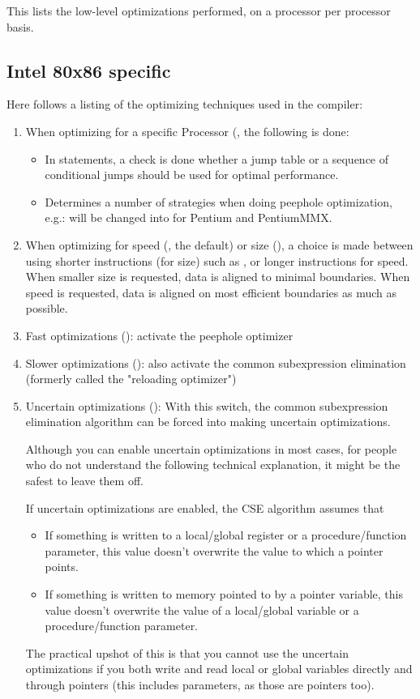 This lists the low-level optimizations performed, on a processor
per processor basis.

\subsection{Intel 80x86 specific}

Here follows a listing of the optimizing techniques used in the compiler:
\begin{enumerate}
\item When optimizing for a specific Processor (,
the following is done:
\begin{itemize}
\item In  statements, a check is done whether a jump table
or a sequence of conditional jumps should be used for optimal performance.
\item Determines a number of strategies when doing peephole optimization, e.g.:
 will be changed into
 for Pentium and PentiumMMX.
\end{itemize}
\item When optimizing for speed (, the default) or size (), a choice is
made between using shorter instructions (for size) such as ,
or longer instructions  for speed. When smaller size is
requested, data is aligned to minimal boundaries.  When speed is
requested, data is aligned on most efficient boundaries as much as possible.
\item Fast optimizations (): activate the peephole optimizer
\item Slower optimizations (): also activate the common subexpression
elimination (formerly called the "reloading optimizer")
\item Uncertain optimizations (): With this switch, the common subexpression
elimination algorithm can be forced into making uncertain optimizations.

Although you can enable uncertain optimizations in most cases, for people who
do not understand the following technical explanation, it might be the safest to
leave them off.

\begin{remark}If uncertain optimizations are enabled, the CSE algorithm assumes
that
\begin{itemize}
\item If something is written to a local/global register or a
procedure/function parameter, this value doesn't overwrite the value to
which a pointer points.
\item If something is written to memory pointed to by a pointer variable,
this value doesn't overwrite the value of a local/global variable or a
procedure/function parameter.
\end{itemize}
\end{remark}
The practical upshot of this is that you cannot use the uncertain
optimizations if you both write and read local or global variables directly and
through pointers (this includes  parameters, as those are pointers too).


\end{enumerate}
